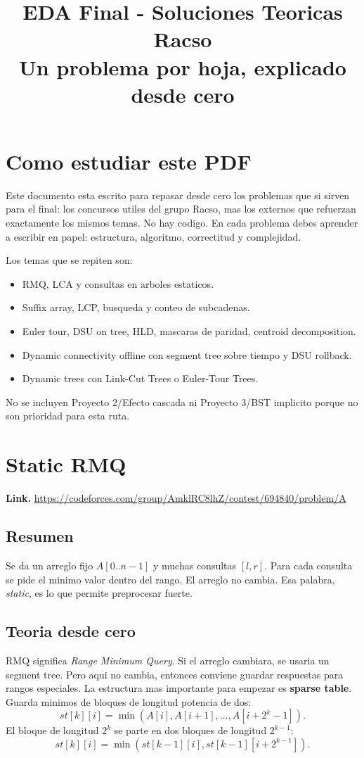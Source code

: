 \documentclass[10pt]{article}
\title{EDA Final - Soluciones Teoricas Racso\\
\large Un problema por hoja, explicado desde cero}
\author{}
\date{}
\begin{document}
\maketitle

\section*{Como estudiar este PDF}
Este documento esta escrito para repasar desde cero los problemas que si sirven
para el final: los concursos utiles del grupo Racso, mas los externos que
refuerzan exactamente los mismos temas. No hay codigo. En cada problema debes
aprender a escribir en papel: estructura, algoritmo, correctitud y complejidad.

Los temas que se repiten son:
\begin{itemize}[leftmargin=*]
\item RMQ, LCA y consultas en arboles estaticos.
\item Suffix array, LCP, busqueda y conteo de subcadenas.
\item Euler tour, DSU on tree, HLD, mascaras de paridad, centroid decomposition.
\item Dynamic connectivity offline con segment tree sobre tiempo y DSU rollback.
\item Dynamic trees con Link-Cut Trees o Euler-Tour Trees.
\end{itemize}

No se incluyen Proyecto 2/Efecto cascada ni Proyecto 3/BST implicito porque no
son prioridad para esta ruta.

\tableofcontents

\clearpage
\section{Static RMQ}
\textbf{Link.} \url{https://codeforces.com/group/AmklRC8lhZ/contest/694840/problem/A}

\subsection*{Resumen}
Se da un arreglo fijo $A[0..n-1]$ y muchas consultas $[l,r]$. Para cada consulta
se pide el minimo valor dentro del rango. El arreglo no cambia. Esa palabra,
\emph{static}, es lo que permite preprocesar fuerte.

\subsection*{Teoria desde cero}
RMQ significa \emph{Range Minimum Query}. Si el arreglo cambiara, se usaria un
segment tree. Pero aqui no cambia, entonces conviene guardar respuestas para
rangos especiales. La estructura mas importante para empezar es \textbf{sparse
table}. Guarda minimos de bloques de longitud potencia de dos:
\[
st[k][i] = \min(A[i], A[i+1], \ldots, A[i+2^k-1]).
\]
El bloque de longitud $2^k$ se parte en dos bloques de longitud $2^{k-1}$:
\[
st[k][i] = \min(st[k-1][i], st[k-1][i+2^{k-1}]).
\]
\end{document}

